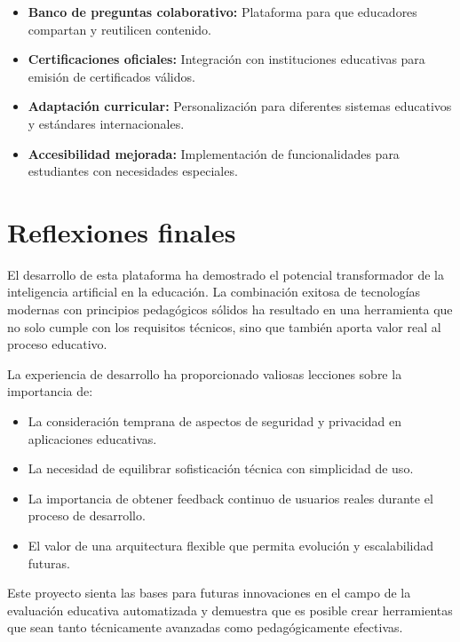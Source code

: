 \documentclass[12pt,a4paper]{report}
\begin{document}
\begin{itemize}
\item \textbf{Banco de preguntas colaborativo:} Plataforma para que educadores compartan y reutilicen contenido.

\item \textbf{Certificaciones oficiales:} Integración con instituciones educativas para emisión de certificados válidos.

\item \textbf{Adaptación curricular:} Personalización para diferentes sistemas educativos y estándares internacionales.

\item \textbf{Accesibilidad mejorada:} Implementación de funcionalidades para estudiantes con necesidades especiales.
\end{itemize}

\section{Reflexiones finales}

El desarrollo de esta plataforma ha demostrado el potencial transformador de la inteligencia artificial en la educación. La combinación exitosa de tecnologías modernas con principios pedagógicos sólidos ha resultado en una herramienta que no solo cumple con los requisitos técnicos, sino que también aporta valor real al proceso educativo.

La experiencia de desarrollo ha proporcionado valiosas lecciones sobre la importancia de:

\begin{itemize}
\item La consideración temprana de aspectos de seguridad y privacidad en aplicaciones educativas.
\item La necesidad de equilibrar sofisticación técnica con simplicidad de uso.
\item La importancia de obtener feedback continuo de usuarios reales durante el proceso de desarrollo.
\item El valor de una arquitectura flexible que permita evolución y escalabilidad futuras.
\end{itemize}

Este proyecto sienta las bases para futuras innovaciones en el campo de la evaluación educativa automatizada y demuestra que es posible crear herramientas que sean tanto técnicamente avanzadas como pedagógicamente efectivas.

\appendix
\end{document}
